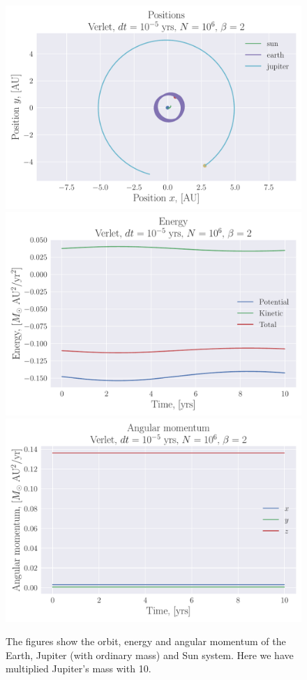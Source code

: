 \documentclass[reprint, english,notitlepage,nofootinbib]{revtex4-1}  %
\begin{document}
\begin{figure}[h]
	\centering
	\includegraphics[width=\linewidth]{../output/three_body10-verlet-5-6-2.pdf}
	\includegraphics[width=\linewidth]{../output/three_body10-verlet-5-6-2_energy.pdf}
	\includegraphics[width=\linewidth]{../output/three_body10-verlet-5-6-2_ang_mom.pdf}
	\caption{The figures show the orbit, energy and angular momentum of the Earth, Jupiter (with ordinary mass) and Sun system. Here we have multiplied Jupiter's mass with 10.}
	\label{fig:three_body10}
\end{figure}
\end{document}
